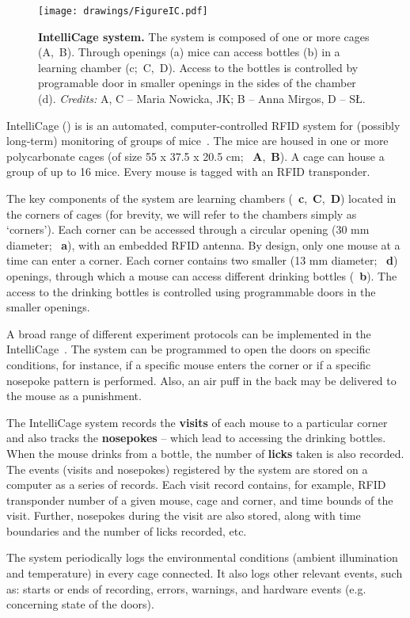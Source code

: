 
\begin{figure*}
  \texttt{[image: drawings/FigureIC.pdf]}
  \caption{
    {\bf IntelliCage system.} 
    The system is composed of one or more cages (A,~B).
    Through openings (a) mice can access bottles (b) in a learning chamber (c;~C,~D).
    Access to the bottles is controlled by programable door in smaller openings in the sides
    of the chamber (d). \emph{Credits:} A, C -- Maria Nowicka, JK; B -- Anna Mirgos, D -- SŁ.
  }
  \label{intellicageSystem}
\end{figure*}

IntelliCage () is is an automated, computer-controlled RFID system for
(possibly long-term) monitoring of groups of
mice~\cite{Galsworthy:2005br,Krackow:2010ck,Puscian:2014cu}. The mice are housed in 
one or more polycarbonate cages (of size 55 x 37.5 x 20.5 cm;
~\textbf{A},~\textbf{B}). A cage can house a group of up to
16 mice. Every mouse is tagged with an RFID transponder.

The key components of the system are learning chambers
(~\textbf{c},~\textbf{C},~\textbf{D}) 
located in the corners of cages
(for brevity, we will refer to the chambers simply as `corners'). Each
corner can be accessed through a circular opening (30 mm diameter; ~\textbf{a}),
with an embedded RFID antenna. By design, only one mouse at a time can enter
a corner. Each corner contains two smaller (13 mm diameter; ~\textbf{d}) openings,
through which a mouse can access different drinking bottles (~\textbf{b}). The access to the
drinking bottles is controlled using programmable doors in
the smaller openings.


A broad range of different experiment protocols can be implemented in the
IntelliCage~\cite{Knapska:2006cz,Kiryk:2011tk,Endo:2011bs,Radwanska:2012fd,Knapska:2013dj,Smutek:2014da,Puscian:2014cu,Vannoni:2014jt}.
The system can be programmed to open the doors on specific conditions, for
instance, if a specific mouse enters the corner or if a specific nosepoke
pattern is performed. Also, an air puff in the back may be delivered to the
mouse as a punishment.

The IntelliCage system records the \textbf{visits} of
each mouse to a particular corner and also tracks the \textbf{nosepokes}
-- which lead to accessing the drinking bottles. When the mouse drinks
from a bottle, the number of \textbf{licks} taken is also recorded.
The events (visits and nosepokes) registered by the system are stored on a
computer as a series of records. Each visit record contains, for example,
RFID transponder number of a given mouse, cage and corner,
and time bounds of the visit. Further,
nosepokes during the visit are also stored, along with
time boundaries and the number of licks recorded, etc.

The system periodically logs the environmental conditions (ambient
illumination and temperature) in every cage connected. It also logs other
relevant events, such as: starts or ends of recording, errors, warnings, and
hardware events (e.g. concerning state of the doors).
